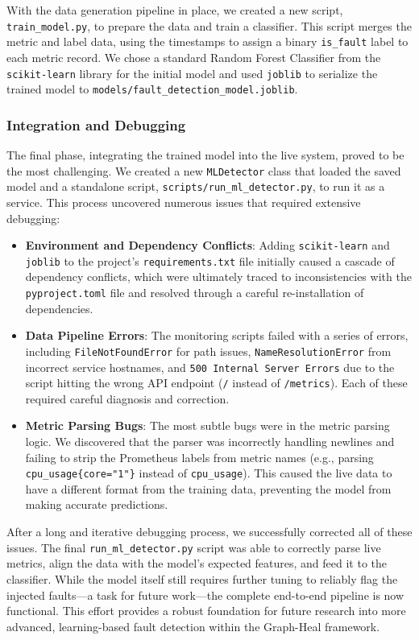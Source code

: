 \documentclass[11pt,conference]{IEEEtran}
\begin{document}
With the data generation pipeline in place, we created a new script, \texttt{train\_model.py}, to prepare the data and train a classifier. This script merges the metric and label data, using the timestamps to assign a binary \texttt{is\_fault} label to each metric record. We chose a standard Random Forest Classifier from the \texttt{scikit-learn} library for the initial model and used \texttt{joblib} to serialize the trained model to \texttt{models/fault\_detection\_model.joblib}.

\subsubsection{Integration and Debugging}
The final phase, integrating the trained model into the live system, proved to be the most challenging. We created a new \texttt{MLDetector} class that loaded the saved model and a standalone script, \texttt{scripts/run\_ml\_detector.py}, to run it as a service. This process uncovered numerous issues that required extensive debugging:
\begin{itemize}
    \item \textbf{Environment and Dependency Conflicts}: Adding \texttt{scikit-learn} and \texttt{joblib} to the project's \texttt{requirements.txt} file initially caused a cascade of dependency conflicts, which were ultimately traced to inconsistencies with the \texttt{pyproject.toml} file and resolved through a careful re-installation of dependencies.
    \item \textbf{Data Pipeline Errors}: The monitoring scripts failed with a series of errors, including \texttt{FileNotFoundError} for path issues, \texttt{NameResolutionError} from incorrect service hostnames, and \texttt{500 Internal Server Errors} due to the script hitting the wrong API endpoint (\texttt{/} instead of \texttt{/metrics}). Each of these required careful diagnosis and correction.
    \item \textbf{Metric Parsing Bugs}: The most subtle bugs were in the metric parsing logic. We discovered that the parser was incorrectly handling newlines and failing to strip the Prometheus labels from metric names (e.g., parsing \texttt{cpu\_usage\{core="1"\}} instead of \texttt{cpu\_usage}). This caused the live data to have a different format from the training data, preventing the model from making accurate predictions.
\end{itemize}

After a long and iterative debugging process, we successfully corrected all of these issues. The final \texttt{run\_ml\_detector.py} script was able to correctly parse live metrics, align the data with the model's expected features, and feed it to the classifier. While the model itself still requires further tuning to reliably flag the injected faults—a task for future work—the complete end-to-end pipeline is now functional. This effort provides a robust foundation for future research into more advanced, learning-based fault detection within the Graph-Heal framework.
\end{document}
